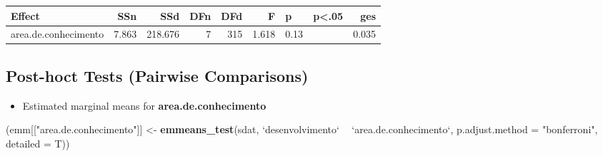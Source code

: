 \documentclass[]{article}
\newenvironment{Shaded}{\begin{snugshade}}{\end{snugshade}}
\newcommand{\DataTypeTok}[1]{\textcolor[rgb]{0.13,0.29,0.53}{#1}}
\newcommand{\KeywordTok}[1]{\textcolor[rgb]{0.13,0.29,0.53}{\textbf{#1}}}
\newcommand{\NormalTok}[1]{#1}
\newcommand{\OperatorTok}[1]{\textcolor[rgb]{0.81,0.36,0.00}{\textbf{#1}}}
\newcommand{\StringTok}[1]{\textcolor[rgb]{0.31,0.60,0.02}{#1}}
\providecommand{\tightlist}{%
  \setlength{\itemsep}{0pt}\setlength{\parskip}{0pt}}
\begin{document}
\begin{longtable}[]{@{}lrrrrrllr@{}}
\toprule
Effect & SSn & SSd & DFn & DFd & F & p & p\textless{}.05 &
ges\tabularnewline
\midrule
\endhead
area.de.conhecimento & 7.863 & 218.676 & 7 & 315 & 1.618 & 0.13 & &
0.035\tabularnewline
\bottomrule
\end{longtable}

\hypertarget{post-hoct-tests-pairwise-comparisons}{%
\subsection{Post-hoct Tests (Pairwise
Comparisons)}\label{post-hoct-tests-pairwise-comparisons}}

\begin{itemize}
\tightlist
\item
  Estimated marginal means for \textbf{area.de.conhecimento}
\end{itemize}

\begin{Shaded}
\begin{Highlighting}[]
\NormalTok{(emm[[}\StringTok{"area.de.conhecimento"}\NormalTok{]] <-}\StringTok{ }\KeywordTok{emmeans_test}\NormalTok{(sdat, }\StringTok{`}\DataTypeTok{desenvolvimento}\StringTok{`} \OperatorTok{~}\StringTok{ `}\DataTypeTok{area.de.conhecimento}\StringTok{`}\NormalTok{, }\DataTypeTok{p.adjust.method =} \StringTok{"bonferroni"}\NormalTok{, }\DataTypeTok{detailed =}\NormalTok{ T))}
\end{Highlighting}
\end{Shaded}
\end{document}
